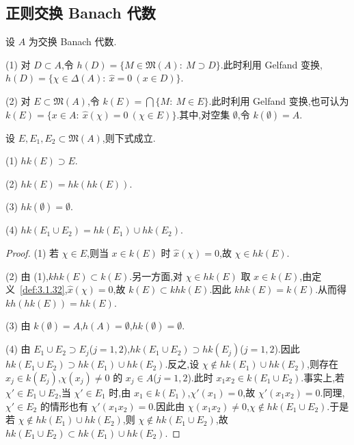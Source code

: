 \subsection{正则交换 Banach 代数}\label{sec:3.1.5}

\begin{definition}\label{def:3.1.32}
设 $A$ 为交换 Banach 代数.

(1) 对 $D \subset A$,令 $h(D) = \{M \in \mathfrak{M}(A):\ M \supset D\}$.此时利用 Gelfand 变换,$h(D) = \{\chi \in \Delta(A):\ \hat{x} = 0\ (x \in D)\}$.

(2) 对 $E \subset \mathfrak{M}(A)$,令 $k(E) = \bigcap\{M:\ M \in E\}$.此时利用 Gelfand 变换,也可认为 $k(E) = \{x \in A:\ \hat{x}(\chi) = 0\ (\chi \in E)\}$.其中,对空集 $\emptyset$,令 $k(\emptyset) = A$.
\end{definition}

\begin{theorem}\label{thm:3.1.33}
设 $E, E_{1}, E_{2} \subset \mathfrak{M}(A)$,则下式成立.

(1) $hk(E) \supset E$.

(2) $hk(E) = hk(hk(E))$.

(3) $hk(\emptyset) = \emptyset$.

(4) $hk(E_{1} \cup E_{2}) = hk(E_{1}) \cup hk(E_{2})$.
\end{theorem}

\begin{proof}
(1) 若 $\chi \in E$,则当 $x \in k(E)$ 时 $\hat{x}(\chi) = 0$,故 $\chi \in hk(E)$.

(2) 由 (1),$khk(E) \subset k(E)$.另一方面,对 $\chi \in hk(E)$ 取 $x \in k(E)$,由定义~\ref{def:3.1.32},$\hat{x}(\chi) = 0$,故 $k(E) \subset khk(E)$.因此 $khk(E) = k(E)$.从而得 $kh(hk(E)) = hk(E)$.

(3) 由 $k(\emptyset) = A$,$h(A) = \emptyset$,$hk(\emptyset) = \emptyset$.

(4) 由 $E_{1} \cup E_{2} \supset E_{j}$($j = 1, 2$),$hk(E_{1} \cup E_{2}) \supset hk(E_{j})$($j = 1, 2$).因此 $hk(E_{1} \cup E_{2}) \supset hk(E_{1}) \cup hk(E_{2})$.反之,设 $\chi \notin hk(E_{1}) \cup hk(E_{2})$,则存在 $x_{j} \in k(E_{j})$,$\chi(x_{j}) \neq 0$ 的 $x_{j} \in A$($j = 1, 2$).此时 $x_{1}x_{2} \in k(E_{1} \cup E_{2})$.事实上,若 $\chi' \in E_{1} \cup E_{2}$,当 $\chi' \in E_{1}$ 时,由 $x_{1} \in k(E_{1})$,$\chi'(x_{1}) = 0$,故 $\chi'(x_{1}x_{2}) = 0$.同理,$\chi' \in E_{2}$ 的情形也有 $\chi'(x_{1}x_{2}) = 0$.因此由 $\chi(x_{1}x_{2}) \neq 0$,$\chi \notin hk(E_{1} \cup E_{2})$.于是若 $\chi \notin hk(E_{1}) \cup hk(E_{2})$,则 $\chi \notin hk(E_{1} \cup E_{2})$,故 $hk(E_{1} \cup E_{2}) \subset hk(E_{1}) \cup hk(E_{2})$.
\end{proof}


